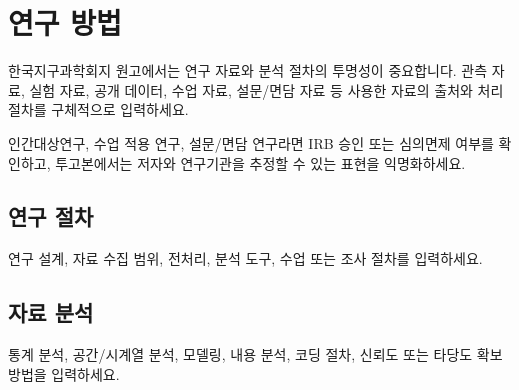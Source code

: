 \section{연구 방법}

한국지구과학회지 원고에서는 연구 자료와 분석 절차의 투명성이 중요합니다. 관측 자료, 실험 자료, 공개 데이터, 수업 자료, 설문/면담 자료 등 사용한 자료의 출처와 처리 절차를 구체적으로 입력하세요.

인간대상연구, 수업 적용 연구, 설문/면담 연구라면 IRB 승인 또는 심의면제 여부를 확인하고, 투고본에서는 저자와 연구기관을 추정할 수 있는 표현을 익명화하세요.

\subsection{연구 절차}

연구 설계, 자료 수집 범위, 전처리, 분석 도구, 수업 또는 조사 절차를 입력하세요.

\subsection{자료 분석}

통계 분석, 공간/시계열 분석, 모델링, 내용 분석, 코딩 절차, 신뢰도 또는 타당도 확보 방법을 입력하세요.
